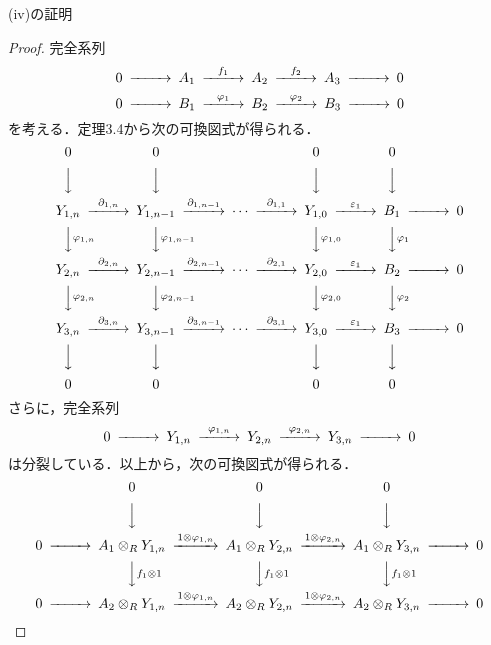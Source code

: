 \begin{screen}
  (iv)の証明
\end{screen}
\begin{proof}
  完全系列
  \[
  \begin{CD}
    0 @>>> A_1 @>{f_1}>> A_2 @>{f_2}>> A_3 @>>> 0
  \end{CD}
  \]
  \[
  \begin{CD}
    0 @>>> B_1 @>{\varphi_1}>> B_2 @>{\varphi_2}>> B_3 @>>> 0
  \end{CD}
  \]
  を考える．定理3.4から次の可換図式が得られる．
  \[
  \begin{CD}
    0 @. 0 @. @. 0 @. 0 \\
    @VVV @VVV @. @VVV @VVV \\
    Y_{1, n} @>{\partial_{1, n}}>> Y_{1, n-1} @>{\partial_{1, n-1}}>> \cdots @>{\partial_{1, 1}}>> Y_{1, 0} @>{\varepsilon_1}>> B_1 @>>> 0 \\
    @VV{\varphi_{1, n}}V @VV{\varphi_{1, n-1}}V @. @VV{\varphi_{1, 0}}V @VV{\varphi_1}V \\
    Y_{2, n} @>{\partial_{2, n}}>> Y_{2, n-1} @>{\partial_{2, n-1}}>> \cdots @>{\partial_{2, 1}}>> Y_{2, 0} @>{\varepsilon_1}>> B_2 @>>> 0 \\
    @VV{\varphi_{2, n}}V @VV{\varphi_{2, n-1}}V @. @VV{\varphi_{2, 0}}V @VV{\varphi_2}V \\
    Y_{3, n} @>{\partial_{3, n}}>> Y_{3, n-1} @>{\partial_{3, n-1}}>> \cdots @>{\partial_{3, 1}}>> Y_{3, 0} @>{\varepsilon_1}>> B_3 @>>> 0 \\
    @VVV @VVV @. @VVV @VVV \\
    0 @. 0 @. @. 0 @. 0
  \end{CD}
  \]
  さらに，完全系列
  \[
  \begin{CD}
    0 @>>> Y_{1, n} @>{\varphi_{1, n}}>> Y_{2, n} @>{\varphi_{2, n}}>> Y_{3, n} @>>> 0
  \end{CD}
  \]
  は分裂している．以上から，次の可換図式が得られる．
  \[
  \begin{CD}
    @. 0 @. 0 @. 0 \\
    @. @VVV @VVV @VVV \\
    0 @>>> A_1 \otimes_R Y_{1, n} @>{1 \otimes \varphi_{1, n}}>> A_1 \otimes_R Y_{2, n} @>{1 \otimes \varphi_{2, n}}>> A_1 \otimes_R Y_{3, n} @>>> 0 \\
    @. @VV{f_1 \otimes 1}V @VV{f_1 \otimes 1}V @VV{f_1 \otimes 1}V \\
    0 @>>> A_2 \otimes_R Y_{1, n} @>{1 \otimes \varphi_{1, n}}>> A_2 \otimes_R Y_{2, n} @>{1 \otimes \varphi_{2, n}}>> A_2 \otimes_R Y_{3, n} @>>> 0 \\

\end{CD}\]
\end{proof}
